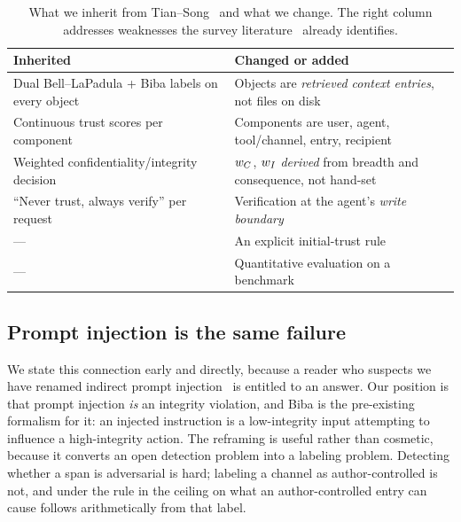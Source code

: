 \begin{table}[t]
\centering
\caption{What we inherit from Tian--Song~\cite{tiansong2021} and what we
change. The right column addresses weaknesses the survey
literature~\cite{he2022zerotrust,sultana2024zerotrust} already identifies.}
\label{tab:tiansong}
\footnotesize
\begin{tabular}{@{}p{}p{}@{}}
\toprule
\textbf{Inherited} & \textbf{Changed or added} \\
\midrule
Dual Bell--LaPadula + Biba labels on every object &
Objects are \emph{retrieved context entries}, not files on disk \\[2pt]
Continuous trust scores per component &
Components are user, agent, tool/channel, entry, recipient \\[2pt]
Weighted confidentiality/integrity decision &
$w_C$, $w_I$ \emph{derived} from breadth and consequence, not hand-set \\[2pt]
``Never trust, always verify'' per request &
Verification at the agent's \emph{write boundary} \\[2pt]
--- &
An explicit initial-trust rule \\[2pt]
--- &
Quantitative evaluation on a benchmark \\
\bottomrule
\end{tabular}
\end{table}

\subsection{Prompt injection is the same failure}
\label{sec:background:injection}

We state this connection early and directly, because a reader who suspects we
have renamed indirect prompt injection~\cite{greshake2023indirect,perez2022ignore}
is entitled to an answer. Our position is that prompt injection \emph{is} an
integrity violation, and Biba is the pre-existing formalism for it: an injected
instruction is a low-integrity input attempting to influence a high-integrity
action. The reframing is useful rather than cosmetic, because it converts an
open detection problem into a labeling problem. Detecting whether a span is
adversarial is hard; labeling a channel as author-controlled is not, and under
the rule in  the ceiling on what an author-controlled
entry can cause follows arithmetically from that label.

